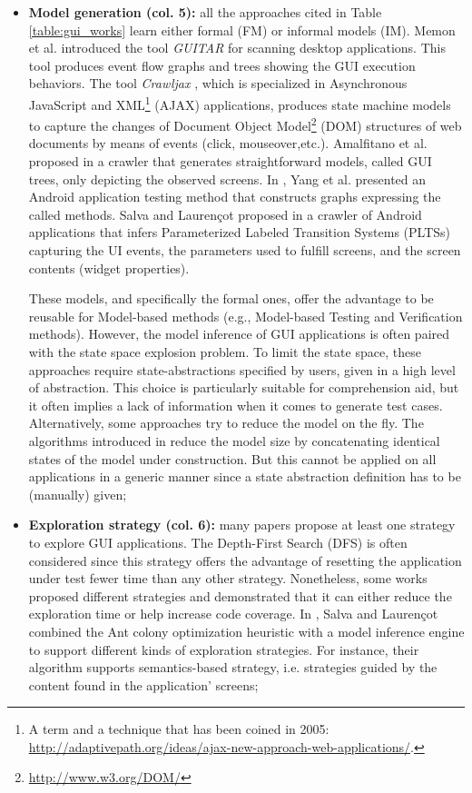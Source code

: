\begin{itemize}
	\item \textbf{Model generation (col. 5):} all the approaches
	cited in Table \ref{table:gui_works} learn either formal
	(FM) or informal models (IM). Memon et al. \cite{guitar}
	introduced the tool \textit{GUITAR} for scanning desktop
	applications. This tool produces event flow graphs and trees
	showing the GUI execution behaviors. The tool
	\textit{Crawljax} \cite{crawljax:tweb12}, which is
	specialized in Asynchronous JavaScript and XML\footnote{A term and a technique that has been coined in 2005: \url{http://adaptivepath.org/ideas/ajax-new-approach-web-applications/}.} (AJAX) applications, produces state machine
	models to capture the changes of Document Object Model\footnote{\url{http://www.w3.org/DOM/}} (DOM)
	structures of web documents by means of events (click,
	mouseover,etc.).
	Amalfitano et al. proposed in
	\cite{Amalfitano:2012:UGR:2351676.2351717} a crawler that
	generates straightforward models, called GUI trees, only
	depicting the observed screens. In \cite{WPX13}, Yang et al.
	presented an Android application testing method that
	constructs graphs expressing the called methods. Salva and
	Laurençot proposed in \cite{SP15} a crawler of Android
	applications that infers Parameterized Labeled Transition
	Systems (PLTSs) capturing the UI events, the parameters used
	to fulfill screens, and the screen contents (widget
	properties).

	These models, and specifically the formal ones, offer the
	advantage to be reusable for Model-based methods
	(e.g., Model-based Testing and Verification methods).
	However, the model inference of GUI applications is often
	paired with the state space explosion problem. To limit the
	state space, these approaches
	\cite{MobiGUITARIEEESoftware2014,guitar,5954416,WPX13,SP15}
	require state-abstractions specified by users, given in a
	high level of abstraction. This choice is particularly
	suitable for comprehension aid, but it often implies a lack
	of information when it comes to generate test cases.
	Alternatively, some approaches try to reduce the model on
	the fly. The algorithms introduced in
	\cite{crawljax:tweb12,4656395} reduce the model size by
	concatenating identical states of the model under
	construction.  But this cannot be  applied on all
	applications in a generic manner since a state abstraction
	definition has to be (manually) given;

	\item \textbf{Exploration strategy (col. 6):} many
	papers propose at least one strategy to explore GUI
	applications. The Depth-First Search (DFS) is often
	considered since this strategy offers the advantage of
	resetting the application under test fewer time than any other
	strategy. Nonetheless, some works proposed different strategies
	\cite{Amalfitano:2012:UGR:2351676.2351717,5954416,crawljax:tweb12,WPX13}
	and demonstrated that it can either reduce the exploration
	time or help increase code coverage. In \cite{SP15}, Salva
	and Laurençot combined the Ant colony optimization heuristic
	with a model inference engine to support different kinds of
	exploration strategies. For instance, their algorithm
	supports semantics-based strategy, i.e. strategies guided by
	the content found in the application' screens;


\end{itemize}
